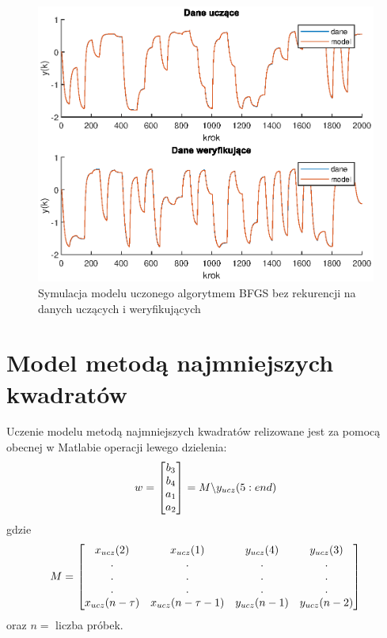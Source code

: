 		\begin{figure}[h!]
			\centering
			\includegraphics[width=\linewidth]{img/BFGS_ARX_d.eps}
			\caption{Symulacja modelu uczonego algorytmem BFGS bez rekurencji na danych uczących i weryfikujących}
			\label{fig:bfgs_arx_d}
		\end{figure}
		
		\newpage
	\section{Model metodą najmniejszych kwadratów}
		\label{sec:mnk}
		Uczenie modelu metodą najmniejszych kwadratów relizowane jest za pomocą obecnej w Matlabie operacji lewego dzielenia:
		\begin{equation}
		\begin{tabular}{l}
		$w = $ $\begin{bmatrix}b_3\\b_4\\a_1\\a_2\end{bmatrix}$ $=M\backslash y_{ucz}(5:end)$
		\end{tabular}
		\label{eq:mnk}
		\end{equation}
		gdzie
		\begin{equation}
		\begin{tabular}{l}
		$M = $ $\begin{bmatrix}x_{ucz}(2)&x_{ucz}(1)&y_{ucz}(4)&y_{ucz}(3)\\.&.&.&.\\.&.&.&.\\.&.&.&.\\x_{ucz}(n-\tau)&x_{ucz}(n-\tau -1)&y_{ucz}(n-1)&y_{ucz}(n-2)\end{bmatrix}$
		\end{tabular}
		\label{eq:M_mnk}
		\end{equation}
		oraz $n =$ liczba próbek.
		
